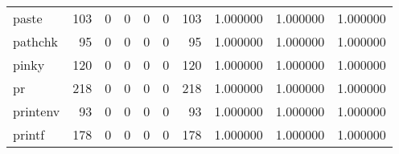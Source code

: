 \begin{longtable}{lrrrrrrrrr}
paste     &                                                103 &                                                  0 &                                                  0 &                                                  0 &                                                  0 &                                                103 &                                           1.000000 &                               1.000000 &                             1.000000 \\
pathchk   &                                                 95 &                                                  0 &                                                  0 &                                                  0 &                                                  0 &                                                 95 &                                           1.000000 &                               1.000000 &                             1.000000 \\
pinky     &                                                120 &                                                  0 &                                                  0 &                                                  0 &                                                  0 &                                                120 &                                           1.000000 &                               1.000000 &                             1.000000 \\
pr        &                                                218 &                                                  0 &                                                  0 &                                                  0 &                                                  0 &                                                218 &                                           1.000000 &                               1.000000 &                             1.000000 \\
printenv  &                                                 93 &                                                  0 &                                                  0 &                                                  0 &                                                  0 &                                                 93 &                                           1.000000 &                               1.000000 &                             1.000000 \\
printf    &                                                178 &                                                  0 &                                                  0 &                                                  0 &                                                  0 &                                                178 &                                           1.000000 &                               1.000000 &                             1.000000 \\

\end{longtable}

